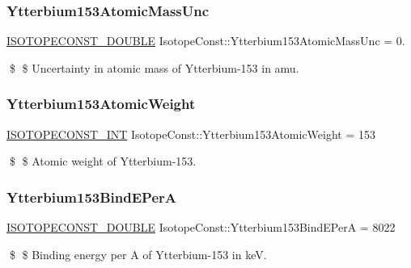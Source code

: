 \subsubsection{\texorpdfstring{Ytterbium153\+Atomic\+Mass\+Unc}{Ytterbium153AtomicMassUnc}}
{\footnotesize\ttfamily \mbox{\hyperlink{group___isotope_const-_macros_ga8f45a7272ce02c0b4c65c44636ed719a}{I\+S\+O\+T\+O\+P\+E\+C\+O\+N\+S\+T\+\_\+\+D\+O\+U\+B\+LE}} Isotope\+Const\+::\+Ytterbium153\+Atomic\+Mass\+Unc = 0.}

\$ \$ Uncertainty in atomic mass of Ytterbium-\/153 in amu. \mbox{\label{group___isotope_const-_ytterbium-_yb153_ga4e45c2a39376208e4ed08a788b041fee}} 
\subsubsection{\texorpdfstring{Ytterbium153\+Atomic\+Weight}{Ytterbium153AtomicWeight}}
{\footnotesize\ttfamily \mbox{\hyperlink{group___isotope_const-_macros_ga5f18360b3e99483a35c32d789e62621c}{I\+S\+O\+T\+O\+P\+E\+C\+O\+N\+S\+T\+\_\+\+I\+NT}} Isotope\+Const\+::\+Ytterbium153\+Atomic\+Weight = 153}

\$ \$ Atomic weight of Ytterbium-\/153. \mbox{\label{group___isotope_const-_ytterbium-_yb153_ga244db6f1373c663aa7ecdd5e963d500e}} 
\subsubsection{\texorpdfstring{Ytterbium153\+Bind\+E\+PerA}{Ytterbium153BindEPerA}}
{\footnotesize\ttfamily \mbox{\hyperlink{group___isotope_const-_macros_ga8f45a7272ce02c0b4c65c44636ed719a}{I\+S\+O\+T\+O\+P\+E\+C\+O\+N\+S\+T\+\_\+\+D\+O\+U\+B\+LE}} Isotope\+Const\+::\+Ytterbium153\+Bind\+E\+PerA = 8022}

\$ \$ Binding energy per A of Ytterbium-\/153 in keV. \mbox{\label{group___isotope_const-_ytterbium-_yb153_gab9ba82202ff22d313f1c198815f9cee8}} 
